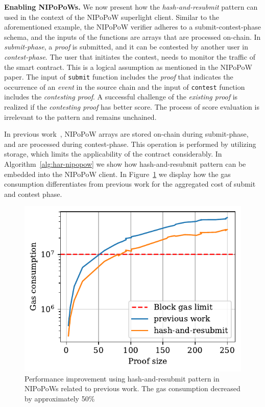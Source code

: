 \noindent \textbf{Enabling NIPoPoWs.} We now present how the
\emph{hash-and-resubmit} pattern can used in the context of the NIPoPoW
superlight client. Similar to the aforementioned example, the NIPoPoW verifier
adheres to a submit-contest-phase schema, and the inputs of the functions are
arrays that are processed on-chain. In \emph{submit-phase}, a \emph{proof} is
submitted, and it can be contested by another user in \emph{contest-phase}. The
user that initiates the contest, needs to monitor the traffic of the smart
contract. This is a logical assumption as mentioned in the NIPoPoW paper. The
input of \texttt{submit} function includes the \emph{proof} that indicates the
occurrence of an \emph{event} in the source chain and the input of
\texttt{contest} function includes the \emph{contesting proof}. A successful
challenge of the \emph{existing proof} is realized if the \emph{contesting
proof} has better score. The process of score evaluation is irrelevant to the
pattern and remains unchained.

In previous work~\cite{gglou}, NIPoPoW arrays are stored on-chain during
submit-phase, and are processed during contest-phase. This operation is
performed by utilizing storage, which limits the applicability of the contract
considerably. In Algorithm~\ref{alg:har-nipopow} we show how hash-and-resubmit
pattern can be embedded into the NIPoPoW client. In
Figure~\ref{fig:har-nipopow} we display how the gas consumption differentiates
from previous work for the aggregated cost of submit and contest phase.




\begin{figure}[h]
    \begin{center}
        \includegraphics[width=1\columnwidth]{figures/har-nipopows.pdf}
    \end{center}
    \caption{Performance improvement using hash-and-resubmit pattern in
    NIPoPoWs related to previous work. The gas consumption decreased by
    approximately 50\%}
    \label{fig:har-nipopow}
\end{figure}
